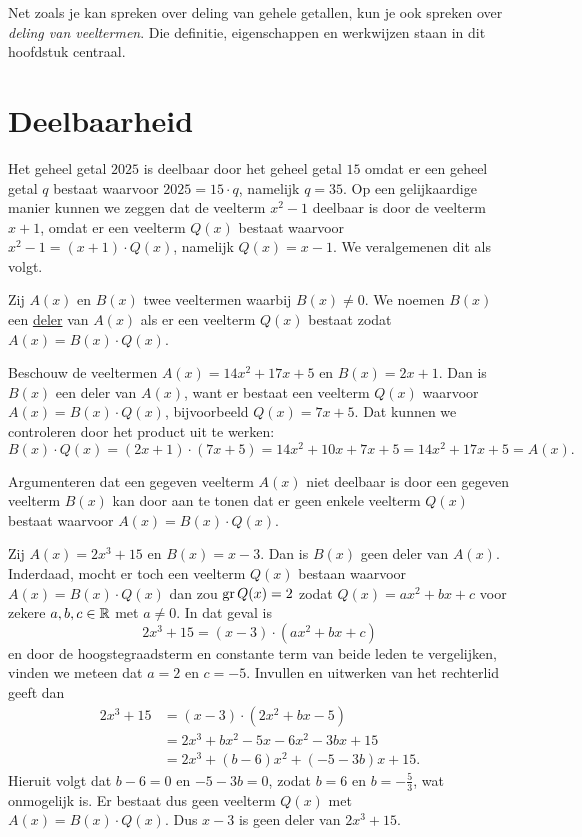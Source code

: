 \documentclass{ximera}
\begin{document}
	\author{Koen De Naeghel}
	\label{xim:veeltermen_deelbaarheid}

Net zoals je kan spreken over deling van gehele getallen, kun je ook spreken over {\em deling van veeltermen}. Die definitie, eigenschappen en werkwijzen staan in dit hoofdstuk centraal. 
\section{Deelbaarheid}

Het geheel getal $2025$ is deelbaar door het geheel getal $15$ omdat er een geheel getal $q$ bestaat waarvoor $2025 = 15\cdot q$, namelijk $q = 35$. Op een gelijkaardige manier kunnen we zeggen dat de veelterm $x^2-1$ deelbaar is door de veelterm $x+1$, omdat er een veelterm $Q(x)$ bestaat waarvoor $x^2-1 = (x+1)\cdot Q(x)$, namelijk $Q(x) = x-1$. We veralgemenen dit als volgt.

\begin{definition}[in woorden]\label{definitie:deler}
Zij $A(x)$ en $B(x)$ twee veeltermen waarbij $B(x) \neq 0$. 
We noemen $B(x)$ een \underline{deler} van $A(x)$ als er een veelterm $Q(x)$ bestaat zodat $A(x) = B(x)\cdot Q(x)$.
\end{definition}

\begin{example}
Beschouw de veeltermen $A(x) = 14x^2+17x+5$ en $B(x) = 2x+1$. Dan is $B(x)$ een deler van $A(x)$, want er bestaat een veelterm $Q(x)$ waarvoor $A(x) = B(x) \cdot Q(x)$, bijvoorbeeld $Q(x) = 7x+5$. Dat kunnen we controleren door het product %
uit te werken:
\[
B(x) \cdot Q(x) = (2x+1) \cdot (7x+5) = 14x^2 + 10x + 7x + 5 = 14x^2 + 17x + 5 = A(x).
\]
\end{example}

Argumenteren dat een gegeven veelterm $A(x)$ niet deelbaar is door een gegeven veelterm $B(x)$ kan door aan te tonen dat er geen enkele veelterm $Q(x)$ bestaat waarvoor $A(x) = B(x) \cdot Q(x)$. 

\begin{example} \label{geendeler}
Zij $A(x) = 2x^3+15$ en $B(x) = x-3$. Dan is $B(x)$ geen deler van $A(x)$. Inderdaad, mocht er toch een veelterm $Q(x)$ bestaan waarvoor $A(x) = B(x) \cdot Q(x)$ dan zou $\operatorname{gr} Q(x) = 2$ zodat $Q(x) = a x^2 + b x + c$ voor zekere $a,b,c \in \mathbb{R}$ met $a \neq 0$. In dat geval is
\[
2x^3+15 = (x-3) \cdot (a x^2 + b x + c) 
\]
en door de hoogstegraadsterm en constante term van beide leden te vergelijken, vinden we meteen dat $a = 2$ en $c = -5$. Invullen en uitwerken van het rechterlid geeft dan
\begin{align*}
2x^3+15 
& = (x-3) \cdot (2 x^2 + b x - 5) \\
& = 2x^3 + bx^2 - 5x - 6x^2 - 3bx + 15 \\
& = 2x^3 + (b-6)x^2 + (-5-3b)x + 15.
\end{align*}
Hieruit volgt dat $b - 6 = 0$ en $-5-3b = 0$, zodat $b = 6$ en $b = -\frac{5}{3}$, wat onmogelijk is. Er bestaat dus geen veelterm $Q(x)$ met $A(x) = B(x) \cdot Q(x)$. Dus $x-3$ is geen deler van $2x^3+15$. 
\end{example}
\end{document}
